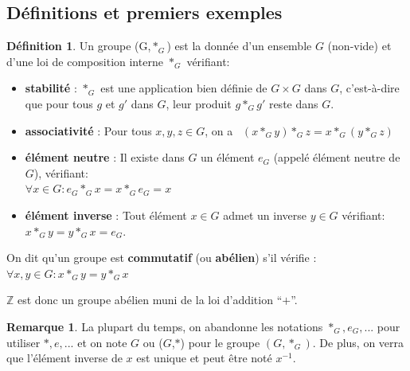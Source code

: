 \documentclass[oneside,12pt,french,table]{book}
\newcommand{\Z}{\mathbb{Z}}
\theoremstyle{definition}
\theoremstyle{definition}
\theoremstyle{definition}
\newtheorem{definition}{Définition}[chapter]
\newtheorem*{remark}{Remarque}
\begin{document}
\subsection{Définitions et premiers exemples}
\begin{definition}
Un groupe (G,$*_G$) est la donnée d'un ensemble $G$ (non-vide) et d'une loi de composition interne $*_G$ vérifiant:
\begin{itemize}
    \item \textbf{stabilité} : $*_G$ est une application bien définie de $G \times G$ dans $G$, c'est-à-dire que pour tous $g$ et $g'$ dans $G$, leur produit $g *_G g'$ reste dans $G$.
    \item \textbf{associativité} : Pour tous $x,y,z \in G$, on a \ $(x*_Gy)*_Gz = x*_G(y*_Gz)$ 
    \item \textbf{élément neutre} : Il existe dans $G$ un élément $e_G$ (appelé élément neutre de $G$), vérifiant: \\ $\forall x \in G : e_G *_G x = x *_G e_G = x$
    \item \textbf{élément inverse} : Tout élément $x \in G$ admet un inverse $y \in G$ vérifiant: \\ $x *_G y = y *_G x = e_G$.
\end{itemize}
\vspace{0.5em}
On dit qu'un groupe est \textbf{commutatif} (ou \textbf{abélien}) s'il vérifie : $\forall x,y \in G : x *_G y = y *_G x$
\end{definition}
\noindent
$\Z$ est donc un groupe abélien muni de la loi d'addition ``$+$''.
\begin{remark}
La plupart du temps, on abandonne les notations $*_G, e_G,...$ pour utiliser $*, e,...$ et on note $G$ ou ($G$,$*$) pour le groupe $(G, *_G)$. De plus, on verra que l'élément inverse de $x$ est unique et peut être noté $x^{-1}$.
\end{remark}
\end{document}
